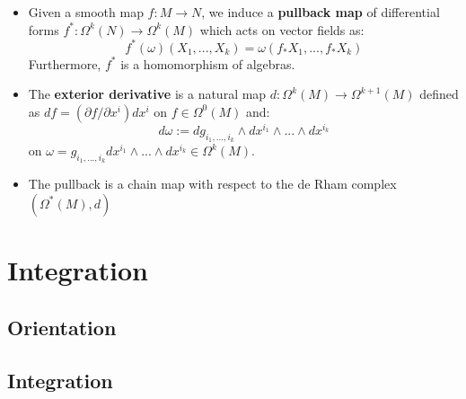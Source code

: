 \documentclass[11pt, oneside]{article}   	%
\theoremstyle{definition}
\begin{document}
\begin{itemize}
	\item Given a smooth map $f : M\rightarrow N$, we induce a \textbf{pullback map} of differential forms $f^* : \Omega^k(N)
	\rightarrow\Omega^k(M)$ which acts on vector fields as:
	\begin{equation}
		f^*(\omega)(X_1, ..., X_k) = \omega(f_* X_1, ..., f_* X_k)
	\end{equation}
	Furthermore, $f^*$ is a homomorphism of algebras. 
	
	\item The \textbf{exterior derivative} is a natural map $d : \Omega^k(M)\rightarrow\Omega^{k + 1}(M)$ defined as 
	$df = (\partial f / \partial x^i)dx^i$ on $f\in\Omega^0(M)$ and:
	\begin{equation}
		d\omega := dg_{i_1, ..., i_k}\wedge dx^{i_1}\wedge ...\wedge 
		dx^{i_k}
	\end{equation}
	on $\omega = g_{i_1, ..., i_k} dx^{i_1}\wedge...\wedge dx^{i_k}\in\Omega^k(M)$. 
	
	\item The pullback is a chain map with respect to the de Rham complex $(\Omega^*(M), d)$
\end{itemize}

\section{Integration}

\subsection{Orientation}

\subsection{Integration}
\end{document}
